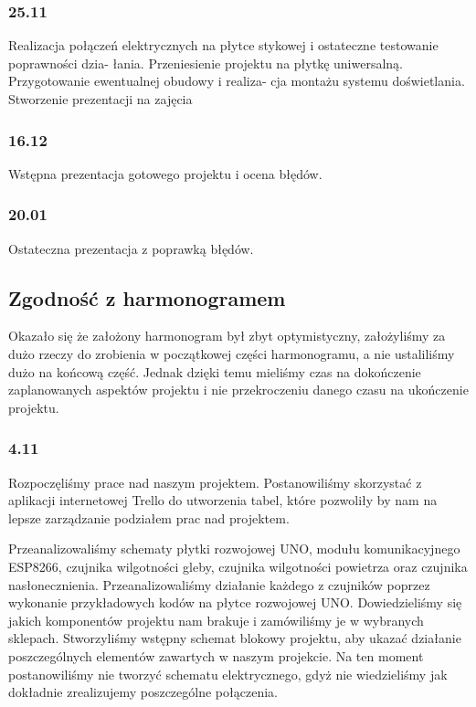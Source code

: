 \documentclass[12pt]{article}
\begin{document}
\subsubsection{25.11}
Realizacja połączeń elektrycznych na płytce stykowej i ostateczne testowanie poprawności dzia-
łania. Przeniesienie projektu na płytkę uniwersalną. Przygotowanie ewentualnej obudowy i realiza-
cja montażu systemu doświetlania. Stworzenie prezentacji na zajęcia

\subsubsection{16.12}
Wstępna prezentacja gotowego projektu i ocena błędów.

\subsubsection{20.01}
Ostateczna prezentacja z poprawką błędów.



\subsection{Zgodność z harmonogramem}
Okazało się że założony harmonogram był zbyt optymistyczny, założyliśmy za dużo rzeczy do zrobienia w początkowej części harmonogramu, a nie ustaliliśmy dużo na końcową część. Jednak dzięki temu mieliśmy czas na dokończenie zaplanowanych aspektów projektu i nie przekroczeniu danego czasu na ukończenie projektu.

\subsubsection{4.11}
Rozpoczęliśmy prace nad naszym projektem. Postanowiliśmy skorzystać z aplikacji internetowej Trello do utworzenia tabel, które pozwoliły by nam na lepsze zarządzanie podziałem prac nad projektem.

Przeanalizowaliśmy schematy płytki rozwojowej UNO, modułu komunikacyjnego ESP8266, czujnika wilgotności gleby, czujnika wilgotności powietrza oraz czujnika nasłonecznienia. Przeanalizowaliśmy działanie każdego z czujników poprzez wykonanie przykładowych kodów na płytce rozwojowej UNO. Dowiedzieliśmy się jakich komponentów projektu nam brakuje i zamówiliśmy je w wybranych sklepach.
Stworzyliśmy wstępny schemat blokowy projektu, aby ukazać działanie poszczególnych elementów zawartych w naszym projekcie. Na ten moment postanowiliśmy nie tworzyć schematu elektrycznego, gdyż nie wiedzieliśmy jak dokładnie zrealizujemy poszczególne połączenia.
\end{document}
